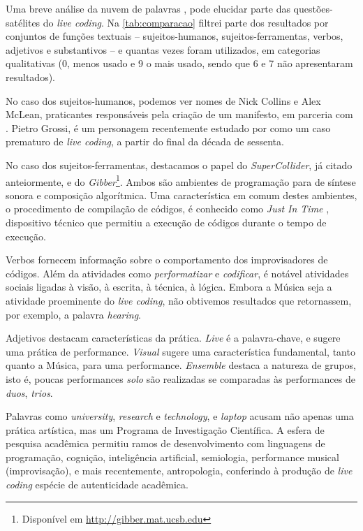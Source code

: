 \begin{table}
\begin{tabular}{ | p{1.45cm} | p{1.3cm} | p{2cm} | p{1.45cm} | p{1.45cm} | p{1.45cm} | p{1.45cm} | p{1.45cm} | p{1.25cm} |}
    \end{tabular}
\label{tab:comparacao}
\end{table}

Uma breve análise da nuvem de palavras ,  pode elucidar parte das questões-satélites do \emph{live coding}. Na \autoref{tab:comparacao} filtrei parte dos resultados por conjuntos de funções textuais -- sujeitos-humanos, sujeitos-ferramentas, verbos, adjetivos e substantivos -- e quantas vezes foram utilizados, em categorias qualitativas (0, menos usado e 9 o mais usado, sendo que 6 e 7 não apresentaram resultados).

No caso dos sujeitos-humanos, podemos ver nomes de Nick Collins e Alex McLean, praticantes responsáveis pela criação de um manifesto, em parceria com . Pietro Grossi, é um personagem recentemente estudado por  como um caso prematuro de \emph{live coding}, a partir do final da década de sessenta.

No caso dos sujeitos-ferramentas, destacamos o papel do \emph{SuperCollider}, já citado anteiormente, e do \emph{Gibber}\cite{roberts_gibber:_2012,wyse_viability_2014}\footnote{Disponível em \url{http://gibber.mat.ucsb.edu}}. Ambos são ambientes de programação para de síntese sonora e composição algorítmica. Uma característica em comum destes ambientes, o procedimento de compilação de códigos, é conhecido como \emph{Just In Time} \cite{aycock_brief_2003}, dispositivo técnico que permitiu a execução de códigos durante o tempo de execução.

Verbos fornecem informação sobre o comportamento dos improvisadores de códigos. Além da atividades como \emph{performatizar} e \emph{codificar}, é notável atividades sociais ligadas à visão, à escrita, à técnica, à lógica. Embora a Música seja a atividade proeminente do \emph{live coding}, não obtivemos resultados que retornassem, por exemplo, a palavra \emph{hearing}. 

Adjetivos destacam características da prática. \emph{Live} é a palavra-chave, e sugere uma prática de performance. \emph{Visual} sugere uma característica fundamental, tanto quanto a Música, para uma performance. \emph{Ensemble} destaca a natureza de grupos, isto é, poucas performances \emph{solo} são realizadas se comparadas às performances de \emph{duos}, \emph{trios}. 

Palavras como \emph{university}, \emph{research} e \emph{technology}, e \emph{laptop} acusam não apenas uma prática artística, mas um Programa de Investigação Científica. A esfera de pesquisa acadêmica permitiu ramos de desenvolvimento com linguagens de programação, cognição, inteligência artificial, semiologia, performance musical (improvisação), e mais recentemente, antropologia, conferindo à produção de \emph{live coding} espécie de autenticidade acadêmica.